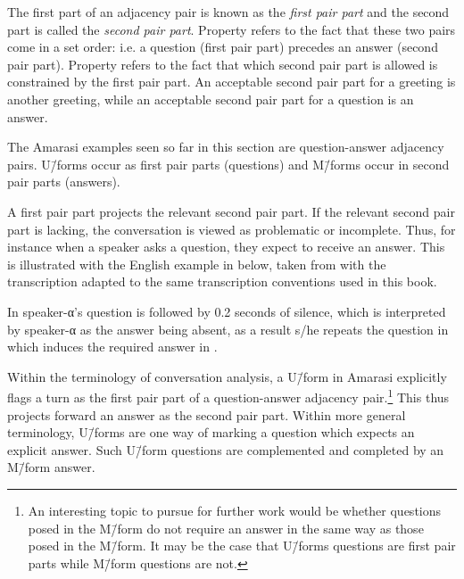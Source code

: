 The first part of an adjacency pair
is known as the \emph{first pair part}
and the second part is called the \emph{second pair part}.
Property  refers to the fact
that these two pairs come in a set order:
i.e. a question (first pair part) precedes an answer (second pair part).
Property  refers to
the fact that which second pair part is allowed
is constrained by the first pair part.
An acceptable second pair part for a greeting
is another greeting, while an acceptable
second pair part for a question is an answer.

The Amarasi examples seen so far in this section
are question-answer adjacency pairs.
U\=/forms occur as first pair parts (questions)
and M\=/forms occur in second pair parts (answers).

A first pair part projects the relevant second pair part.
If the relevant second pair part is lacking,
the conversation is viewed as problematic or incomplete.
Thus, for instance when a speaker asks a question,
they expect to receive an answer.
This is illustrated with the English example in  below,
taken from \cite{li07} with the transcription adapted to the same
transcription conventions used in this book.

\begin{exe}
	\label{ex:ACon}
	\begin{xlist}
		\label{ex:ACon-1}
		\label{ex:ACon-2}
		\label{ex:ACon-3}
		\label{ex:ACon-4}
	\end{xlist}
\end{exe}

In  speaker-α's question is followed by 0.2 seconds of silence,
which is interpreted by speaker-α as the answer being absent,
as a result s/he repeats the question in 
which induces the required answer in .

Within the terminology of conversation analysis,
a U\=/form in Amarasi explicitly flags a turn as
the first pair part of a question-answer adjacency pair.\footnote{
		An interesting topic to pursue for further work
		would be whether questions posed in the M\=/form
		do not require an answer in the same way as those posed in the M\=/form.
		It may be the case that U\=/forms questions are first pair parts
		while M\=/form questions are not.}
This thus projects forward an answer as the second pair part.
Within more general terminology,
U\=/forms are one way of marking a question
which expects an explicit answer.
Such U\=/form questions are complemented and completed by an M\=/form answer.

